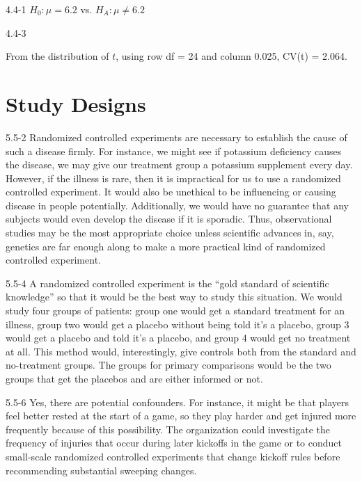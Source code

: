 \begin{exsol@solution}{4.4-1}
	  $H_0: \mu = 6.2$ vs. $H_A: \mu \neq 6.2$
\end{exsol@solution}
\begin{exsol@solution}{4.4-3}

    From the distribution of $t$, using row df = 24 and column 0.025, CV(t) = 2.064.
\end{exsol@solution}
\setcounter{chapter}{4}\chapter{Study Designs}
\begin{exsol@solution}{5.5-2}
Randomized controlled experiments are necessary to establish the cause of such a disease firmly. For instance, we might see if potassium deficiency causes the disease, we may give our treatment group a potassium supplement every day. However, if the illness is rare, then it is impractical for us to use a randomized controlled experiment.  It would also be unethical to be influencing or causing disease in people potentially.  Additionally, we would have no guarantee that any subjects would even develop the disease if it is sporadic. Thus, observational studies may be the most appropriate choice unless scientific advances in, say, genetics are far enough along to make a more practical kind of randomized controlled experiment.

\end{exsol@solution}
\begin{exsol@solution}{5.5-4}
A randomized controlled experiment is the ``gold standard of scientific knowledge'' so that it would be the best way to study this situation. We would study four groups of patients: group one would get a standard treatment for an illness, group two would get a placebo without being told it's a placebo, group 3 would get a placebo and told it's a placebo, and group 4 would get no treatment at all. This method would, interestingly, give controls both from the standard and no-treatment groups. The groups for primary comparisons would be the two groups that get the placebos and are either informed or not.

\end{exsol@solution}
\begin{exsol@solution}{5.5-6}
Yes, there are potential confounders. For instance, it might be that players feel better rested at the start of a game, so they play harder and get injured more frequently because of this possibility. The organization could investigate the frequency of injuries that occur during later kickoffs in the game or to conduct small-scale randomized controlled experiments that change kickoff rules before recommending substantial sweeping changes.

\end{exsol@solution}
